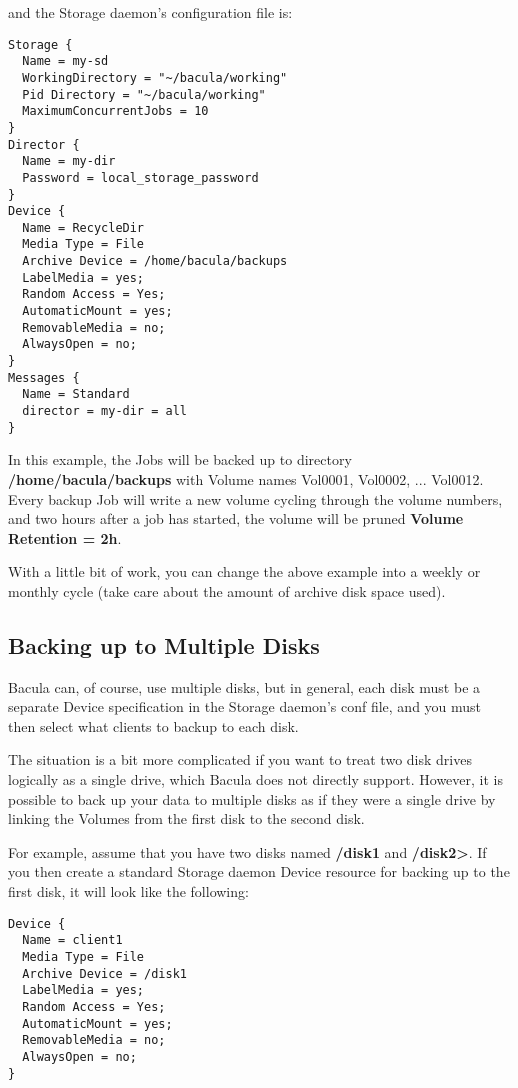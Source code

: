 and the Storage daemon's configuration file is: 

\footnotesize
\begin{verbatim}
Storage {
  Name = my-sd
  WorkingDirectory = "~/bacula/working"
  Pid Directory = "~/bacula/working"
  MaximumConcurrentJobs = 10
}
Director {
  Name = my-dir
  Password = local_storage_password
}
Device {
  Name = RecycleDir
  Media Type = File
  Archive Device = /home/bacula/backups
  LabelMedia = yes;
  Random Access = Yes;
  AutomaticMount = yes;
  RemovableMedia = no;
  AlwaysOpen = no;
}
Messages {
  Name = Standard
  director = my-dir = all
}
\end{verbatim}
\normalsize

In this example, the Jobs will be backed up to directory {\bf
/home/bacula/backups} with Volume names Vol0001, Vol0002, ... Vol0012. Every
backup Job will write a new volume cycling through the volume numbers, and two
hours after a job has started, the volume will be pruned {\bf Volume Retention
= 2h}. 

With a little bit of work, you can change the above example into a weekly or
monthly cycle (take care about the amount of archive disk space used). 
\label{MultipleDisks}

\subsection*{Backing up to Multiple Disks}

Bacula can, of course, use multiple disks, but in general, each disk must be a
separate Device specification in the Storage daemon's conf file, and you must
then select what clients to backup to each disk. 

The situation is a bit more complicated if you want to treat two disk drives
logically as a single drive, which Bacula does not directly support. However,
it is possible to back up your data to multiple disks as if they were a single
drive by linking the Volumes from the first disk to the second disk. 

For example, assume that you have two disks named {\bf /disk1} and {\bf
/disk2>}. If you then create a standard Storage daemon Device resource for
backing up to the first disk, it will look like the following: 

\footnotesize
\begin{verbatim}
Device {
  Name = client1
  Media Type = File
  Archive Device = /disk1
  LabelMedia = yes;
  Random Access = Yes;
  AutomaticMount = yes;
  RemovableMedia = no;
  AlwaysOpen = no;
}
\end{verbatim}
\normalsize

